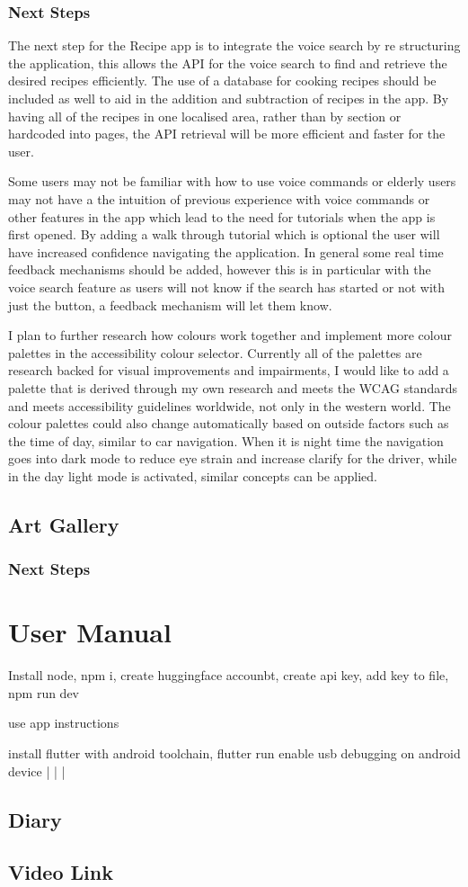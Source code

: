\documentclass[]{project_final}
\begin{document}
\subsection{Next Steps}

The next step for the Recipe app is to integrate the voice search by re structuring the application, this allows the API for the voice search to find and retrieve the desired recipes efficiently. The use of a database for cooking recipes should be included as well to aid in the addition and subtraction of recipes in the app. By having all of the recipes in one localised area, rather than by section or hardcoded into pages, the API retrieval will be more efficient and faster for the user.

Some users may not be familiar with how to use voice commands or elderly users may not have a the intuition of previous experience with voice commands or other features in the app which lead to the need for tutorials when the app is first opened. By adding a walk through tutorial which is optional the user will have increased confidence navigating the application.
In general some real time feedback mechanisms should be added, however this is in particular with the voice search feature as users will not know if the search has started or not with just the button, a feedback mechanism will let them know.

I plan to further research how colours work together and implement more colour palettes in the accessibility colour selector. Currently all of the palettes are research backed for visual improvements and impairments, I would like to add a palette that is derived through my own research and meets the WCAG standards and meets accessibility guidelines worldwide, not only in the western world.
The colour palettes could also change automatically based on outside factors such as the time of day, similar to car navigation. When it is night time the navigation goes into dark mode to reduce eye strain and increase clarify for the driver, while in the day light mode is activated, similar concepts can be applied.


\section{Art Gallery}

\subsection{Next Steps}



\chapter{User Manual}
Install node, npm i, create huggingface accounbt, create api key, add key to file, npm run dev

use app instructions

install flutter with android toolchain, flutter run
enable usb debugging on android device | | |
\section{Diary}
\section{Video Link}
\end{document}
